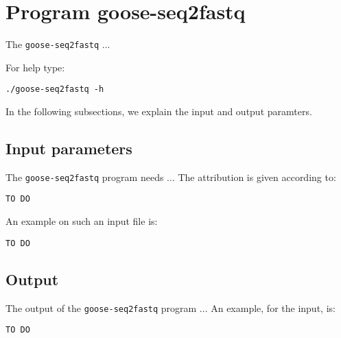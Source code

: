 \section{Program goose-seq2fastq}
The \texttt{goose-seq2fastq} ...

For help type:
\begin{lstlisting}
./goose-seq2fastq -h
\end{lstlisting}
In the following subsections, we explain the input and output paramters.

\subsection{Input parameters}

The \texttt{goose-seq2fastq} program needs ...
The attribution is given according to:
\begin{lstlisting}
TO DO
\end{lstlisting}

An example on such an input file is:
\begin{lstlisting}
TO DO
\end{lstlisting}

\subsection{Output}
The output of the \texttt{goose-seq2fastq} program ...
An example, for the input, is:
\begin{lstlisting}
TO DO
\end{lstlisting}
